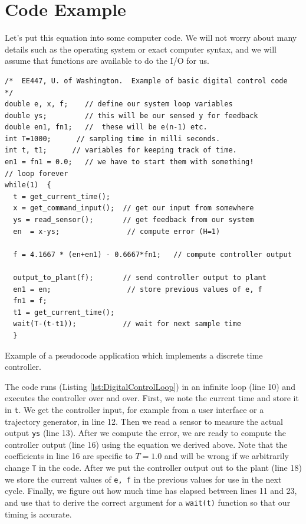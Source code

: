 
\section{Code Example}

 Let's put this equation into some computer code.  We will not worry about many details such as the operating system or exact computer syntax, and we will assume that functions are available to do the I/O for us.


\begin{listing}
\begin{verbatim}
/*  EE447, U. of Washington.  Example of basic digital control code  */
double e, x, f;    // define our system loop variables
double ys;         // this will be our sensed y for feedback
double en1, fn1;   //  these will be e(n-1) etc.
int T=1000;      // sampling time in milli seconds.
int t, t1;      // variables for keeping track of time.
en1 = fn1 = 0.0;   // we have to start them with something!
// loop forever
while(1)  {
  t = get_current_time();
  x = get_command_input();  // get our input from somewhere
  ys = read_sensor();       // get feedback from our system
  en  = x-ys;                // compute error (H=1)

  f = 4.1667 * (en+en1) - 0.6667*fn1;   // compute controller output

  output_to_plant(f);       // send controller output to plant
  en1 = en;                  // store previous values of e, f
  fn1 = f;
  t1 = get_current_time();
  wait(T-(t-t1));           // wait for next sample time
  }
\end{verbatim}
\caption{Example of a pseudocode application which implements a discrete time controller.}
\label{lst:DigitalControlLoop}
\end{listing}	%


The code runs (Listing \ref{lst:DigitalControlLoop}) in an infinite loop (line 10) and executes the controller over and over.  First, we note the current time and store it in {\tt t}.  We get the controller input, for example from a user interface or a trajectory generator, in line 12.   Then we read a sensor to measure the actual output {\tt ys} (line 13).  After we compute the error, we are ready to compute the controller output (line 16) using the equation we derived above.  Note that the coefficients in line 16 are specific to $T=1.0$ and will be wrong if we arbitrarily change {\tt T} in the code.   After we put the controller output out to the plant (line 18) we store the current values of {\tt e, f} in the previous values for use in the next cycle.   Finally, we figure out how much time has elapsed between lines 11 and 23, and use that to derive the correct argument for a {\tt wait(t)} function so that our timing is accurate.


